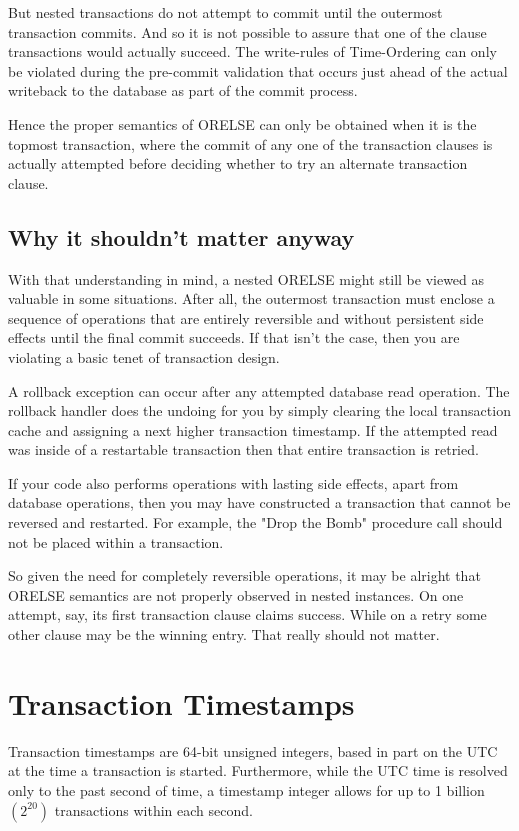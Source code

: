 \documentclass[article,oneside]{memoir}
\begin{document}
But nested transactions do not attempt to commit until the outermost transaction commits. And so it is not possible to assure that one of the clause transactions would actually succeed. The write-rules of Time-Ordering can only be violated during the pre-commit validation that occurs just ahead of the actual writeback to the database as part of the commit process.

Hence the proper semantics of {\ttfamily ORELSE} can only be obtained when it is the topmost transaction, where the commit of any one of the transaction clauses is actually attempted before deciding whether to try an alternate transaction clause.

\subsection{Why it shouldn't matter anyway}
With that understanding in mind, a nested {\ttfamily ORELSE} might still be viewed as valuable in some situations. After all, the outermost transaction must enclose a sequence of operations that are entirely reversible and without persistent side effects until the final commit succeeds. If that isn't the case, then you are violating a basic tenet of transaction design. 

A rollback exception can occur after any attempted database read operation. The rollback handler does the undoing for you by simply clearing the local transaction cache and assigning a next higher transaction timestamp. If the attempted read was inside of a restartable transaction then that entire transaction is retried.

If your code also performs operations with lasting side effects, apart from database operations, then you may have constructed a transaction that cannot be reversed and restarted. For example, the "Drop the Bomb" procedure call should not be placed within a transaction.

So given the need for completely reversible operations, it may be alright that {\ttfamily ORELSE} semantics are not properly observed in nested instances. On one attempt, say, its first transaction clause claims success. While on a retry some other clause may be the winning entry. That really should not matter.


\section{Transaction Timestamps}
Transaction timestamps are 64-bit unsigned integers, based in part on the UTC at the time a transaction is started. Furthermore, while the UTC time is resolved only to the past second of time, a timestamp integer allows for up to 1 billion $(2^{20})$ transactions within each second.
\end{document}
